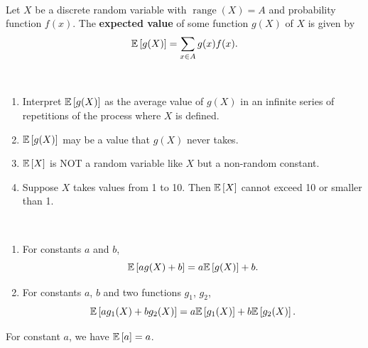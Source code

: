 \begin{theorem}
    \phantom{}  \\
    Let $X$ be a discrete random variable with $\operatorname{range}{(X)} = A$ and
    probability function $f(x)$. The \textbf{expected value} of some function $g(X)$
    of $X$ is given by
    \[\mathbb{E}\left[{g(X)}\right] = \sum_{x \in A} g(x)f(x).\]    
\end{theorem}


\begin{note}
    \phantom{}\
    \begin{enumerate}
        \item Interpret $\mathbb{E}\left[{g(X)}\right]$ as the average value of $g(X)$ in an infinite series of repetitions of the process where $X$ is defined.
        \item $\mathbb{E}\left[{g(X)}\right]$ may be a value that $g(X)$ never takes.
        \item $\mathbb{E}\left[{X}\right]$ is NOT a random variable like $X$ but a non-random constant.
        \item Suppose $X$ takes values from 1 to 10. Then $\mathbb{E}\left[{X}\right]$ cannot exceed 10 or smaller than 1.
    \end{enumerate}
\end{note}

\begin{theorem}
    \phantom{}  \
    \begin{enumerate}
        \item For constants $a$ and $b$, \[\displaystyle \mathbb{E}\left[{ag(X) + b}\right] = a\mathbb{E}\left[{g(X)}\right] + b.\]
        \item For constants $a$, $b$ and two functions $g_1$, $g_2$, 
        \[\mathbb{E}\left[{ag_1(X) + bg_2(X)}\right] = a\mathbb{E}\left[{g_1(X)}\right] + b\mathbb{E}\left[{g_2(X)}\right].\]
    \end{enumerate}
\end{theorem}

\begin{note}
    For constant $a$, we have $\mathbb{E}\left[{a}\right] = a$.
\end{note}

\pagebreak 



